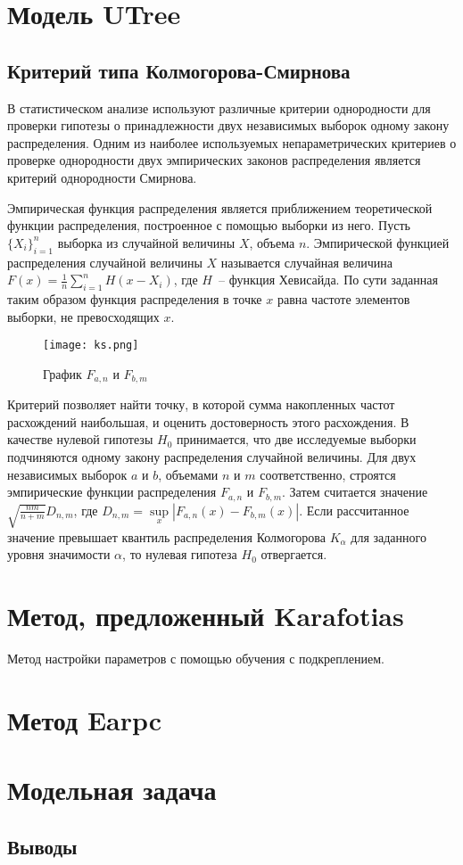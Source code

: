 \section{Модель UTree}

\subsection{Критерий типа Колмогорова-Смирнова}
\label{ks_criteria}
В статистическом анализе используют различные критерии однородности для проверки гипотезы о принадлежности двух независимых выборок одному закону распределения. Одним из наиболее используемых непараметрических критериев о проверке однородности двух эмпирических законов распределения является критерий однородности Смирнова.

Эмпирическая функция распределения является приближением теоретической функции распределения, построенное с помощью выборки из него. Пусть $\{X_i\}_{i = 1}^n$ выборка из случайной величины $X$, объема $n$. Эмпирической функцией распределения случайной величины $X$ называется случайная величина $F(x) = \frac{1}{n}\sum\limits_{i = 1}^n{H(x - X_i)}$, где $H$~-- функция Хевисайда. По сути заданная таким образом функция распределения в точке $x$ равна частоте элементов выборки, не превосходящих $x$.

\begin{figure}
    \centering
    \texttt{[image: ks.png]}
    \caption{График $F_{a, n}$ и $F_{b, m}$}
    \label{ks}
\end{figure}

Критерий позволяет найти точку, в которой сумма накопленных частот расхождений наибольшая, и оценить достоверность этого расхождения. В качестве нулевой гипотезы $H_0$ принимается, что две исследуемые выборки подчиняются одному закону распределения случайной величины. Для двух независимых выборок $a$ и $b$, объемами $n$ и $m$ соответственно, строятся эмпирические функции распределения $F_{a, n}$ и $F_{b, m}$. Затем считается значение $\sqrt{\frac{nm}{n + m}}D_{n, m}$, где $D_{n, m} = \sup\limits_x|F_{a, n}(x) - F_{b, m}(x)|$. Если рассчитанное значение превышает квантиль распределения Колмогорова $K_{\alpha}$ для заданного уровня значимости $\alpha$, то нулевая гипотеза $H_0$ отвергается.

\section{Метод, предложенный Karafotias}
Метод настройки параметров с помощью обучения с подкреплением.

\section{Метод Earpc}


\section{Модельная задача}

\subsection{Выводы}

